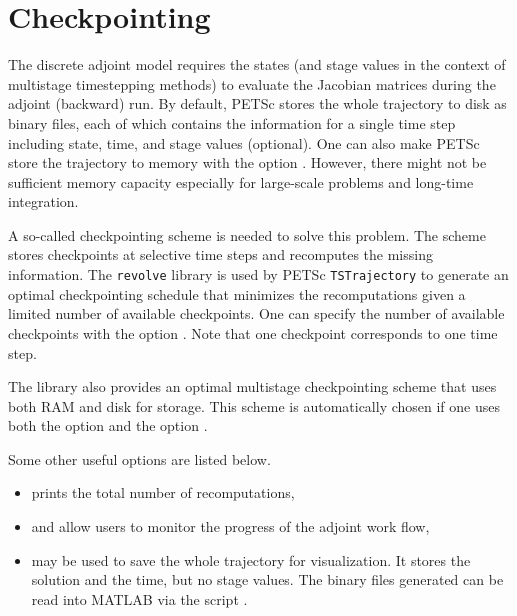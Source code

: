 \section{Checkpointing}

The discrete adjoint model requires the states (and stage values
in the context of multistage timestepping methods) to evaluate the
Jacobian matrices during the adjoint (backward) run. By default,
PETSc stores the whole trajectory to disk as binary files, each of
which contains the information for a single time step including
state, time, and stage values (optional). One can also make PETSc
store the trajectory to memory with the option .
However, there might not be sufficient memory capacity especially
for large-scale problems and long-time integration.

A so-called checkpointing scheme is needed to solve this problem.
The scheme stores checkpoints at selective time steps and recomputes
the missing information. The \lstinline{revolve} library is used by PETSc
\lstinline{TSTrajectory} to generate an optimal checkpointing schedule that
minimizes the recomputations given a limited number of available
checkpoints. One can specify the number of available checkpoints
with the option .
Note that one checkpoint corresponds to one time step.

The  library also provides an optimal multistage
checkpointing scheme that uses both RAM and disk for storage.
This scheme is automatically chosen if one uses both the option 
and the option .

Some other useful options are listed below.
\begin{itemize}
\item {} prints the total number of recomputations,
\item {} and  allow users to monitor the progress of the adjoint work flow,
\item {} may be used to save the whole trajectory for visualization. It stores the solution and the time, but no stage values. The binary files generated can be read into MATLAB via the script .
\end{itemize}

